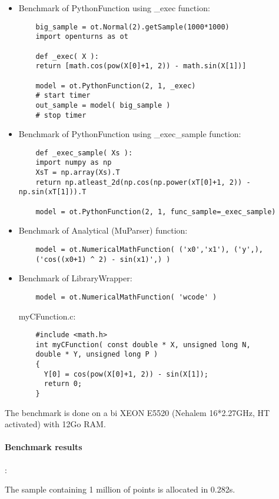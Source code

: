 \begin{itemize}
\item Benchmark of PythonFunction using \_exec function:
  \begin{lstlisting}
    big_sample = ot.Normal(2).getSample(1000*1000)
    import openturns as ot

    def _exec( X ):
    return [math.cos(pow(X[0]+1, 2)) - math.sin(X[1])]

    model = ot.PythonFunction(2, 1, _exec)
    # start timer
    out_sample = model( big_sample )
    # stop timer
  \end{lstlisting}

\item Benchmark of PythonFunction using \_exec\_sample function:
  \begin{lstlisting}
    def _exec_sample( Xs ):
    import numpy as np
    XsT = np.array(Xs).T
    return np.atleast_2d(np.cos(np.power(xT[0]+1, 2)) - np.sin(xT[1])).T

    model = ot.PythonFunction(2, 1, func_sample=_exec_sample)
  \end{lstlisting}

\item Benchmark of Analytical (MuParser) function:
  \begin{lstlisting}
    model = ot.NumericalMathFunction( ('x0','x1'), ('y',),
    ('cos((x0+1) ^ 2) - sin(x1)',) )
  \end{lstlisting}

\item Benchmark of LibraryWrapper:
  \begin{lstlisting}
    model = ot.NumericalMathFunction( 'wcode' )
  \end{lstlisting}
  myCFunction.c:
  \begin{lstlisting}
    #include <math.h>
    int myCFunction( const double * X, unsigned long N,
    double * Y, unsigned long P )
    {
      Y[0] = cos(pow(X[0]+1, 2)) - sin(X[1]);
      return 0;
    }
  \end{lstlisting}
\end{itemize}


The benchmark is done on a bi XEON E5520 (Nehalem 16*2.27GHz, HT activated) with 12Go RAM.


\paragraph{Benchmark results}:

The sample containing 1 million of points is allocated in 0.282s.

